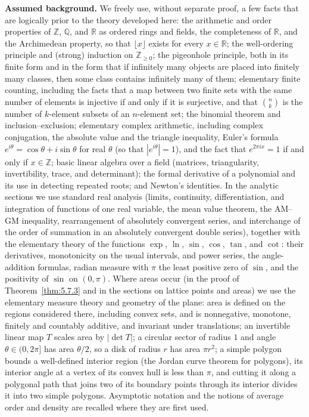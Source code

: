 \documentclass[11pt]{article}
\theoremstyle{ntstyle}
\begin{document}
\noindent \textbf{Assumed background.} We freely use, without separate proof, a few facts that are logically prior to the theory developed here: the arithmetic and order properties of $\mathbb{Z}$, $\mathbb{Q}$, and $\mathbb{R}$ as ordered rings and fields, the completeness of $\mathbb{R}$, and the Archimedean property, so that $\lfloor x\rfloor$ exists for every $x\in\mathbb{R}$; the well-ordering principle and (strong) induction on $\mathbb{Z}_{\ge0}$; the pigeonhole principle, both in its finite form and in the form that if infinitely many objects are placed into finitely many classes, then some class contains infinitely many of them; elementary finite counting, including the facts that a map between two finite sets with the same number of elements is injective if and only if it is surjective, and that $\binom{n}{k}$ is the number of $k$-element subsets of an $n$-element set; the binomial theorem and inclusion--exclusion; elementary complex arithmetic, including complex conjugation, the absolute value and the triangle inequality, Euler's formula $e^{i\theta}=\cos\theta+i\sin\theta$ for real $\theta$ (so that $|e^{i\theta}|=1$), and the fact that $e^{2\pi i x}=1$ if and only if $x\in\mathbb{Z}$; basic linear algebra over a field (matrices, triangularity, invertibility, trace, and determinant); the formal derivative of a polynomial and its use in detecting repeated roots; and Newton's identities. In the analytic sections we use standard real analysis (limits, continuity, differentiation, and integration of functions of one real variable, the mean value theorem, the AM--GM inequality, rearrangement of absolutely convergent series, and interchange of the order of summation in an absolutely convergent double series), together with the elementary theory of the functions $\exp$, $\ln$, $\sin$, $\cos$, $\tan$, and $\cot$: their derivatives, monotonicity on the usual intervals, and power series, the angle-addition formulas, radian measure with $\pi$ the least positive zero of $\sin$, and the positivity of $\sin$ on $(0,\pi)$. Where areas occur (in the proof of Theorem~\ref{thm:5.7.3} and in the sections on lattice points and areas) we use the elementary measure theory and geometry of the plane: area is defined on the regions considered there, including convex sets, and is nonnegative, monotone, finitely and countably additive, and invariant under translations; an invertible linear map $T$ scales area by $|\det T|$; a circular sector of radius $1$ and angle $\theta\in(0,2\pi]$ has area $\theta/2$, so a disk of radius $r$ has area $\pi r^2$; a simple polygon bounds a well-defined interior region (the Jordan curve theorem for polygons), its interior angle at a vertex of its convex hull is less than $\pi$, and cutting it along a polygonal path that joins two of its boundary points through its interior divides it into two simple polygons. Asymptotic notation and the notions of average order and density are recalled where they are first used.
\end{document}
